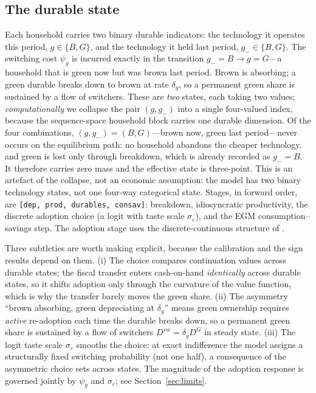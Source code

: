 \documentclass[11pt,a4paper]{article}
\begin{document}
\subsection{The durable state}

Each household carries two binary durable indicators: the technology it
operates this period, $g\in\{B,G\}$, and the technology it held last period,
$g_{-}\in\{B,G\}$. The switching cost $\psi_g$ is incurred exactly in the
transition $g_{-}=B\to g=G$---a household that is green now but was brown last
period. Brown is absorbing; a green durable breaks down to brown at rate
$\delta_g$, so a permanent green share is sustained by a flow of switchers.
These are \emph{two} states, each taking two values; \emph{computationally}
we collapse the pair $(g,g_{-})$ into a single four-valued index, because the
sequence-space household block carries one durable dimension. Of the four
combinations, $(g,g_{-})=(B,G)$---brown now, green last period---never occurs on
the equilibrium path: no household abandons the cheaper technology, and green
is lost only through breakdown, which is already recorded as $g_{-}=B$. It
therefore carries zero mass and the effective state is three-point. This is an
artefact of the collapse, not an economic assumption: the model has two binary
technology states, not one four-way categorical state.
Stages, in forward order, are \texttt{[dep, prod, durables, consav]}:
breakdown, idiosyncratic productivity, the discrete adoption choice (a logit
with taste scale $\sigma_{\varepsilon}$), and the EGM consumption--savings
step. The adoption stage uses the discrete-continuous structure of
\citet{DCEGM2017}.

Three subtleties are worth making explicit, because the calibration and the
sign results depend on them. (i) The choice compares continuation values across
durable states; the fiscal transfer enters cash-on-hand \emph{identically}
across durable states, so it shifts adoption only through the curvature of the
value function, which is why the transfer barely moves the green share.
(ii) The asymmetry ``brown absorbing, green depreciating at $\delta_g$'' means
green ownership requires \emph{active} re-adoption each time the durable breaks
down, so a permanent green share is sustained by a flow of switchers
$D^{sw}=\delta_g D^{G}$ in steady state. (iii) The logit taste scale
$\sigma_\varepsilon$ smooths the choice: at exact indifference the model assigns
a structurally fixed switching probability (not one half), a consequence of the
asymmetric choice sets across states. The magnitude of the adoption response is
governed jointly by $\psi_g$ and $\sigma_\varepsilon$; see
Section~\ref{sec:limits}.
\end{document}
